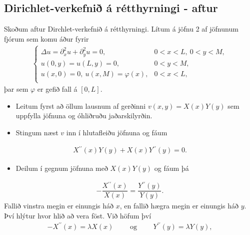 \documentclass[a4paper,10pt,icelandic]{sphinxmanual}
\begin{document}
\subsection{Dirichlet-verkefnið á rétthyrningi - aftur}
\label{\detokenize{Kafli03:dirichlet-verkefni-a-retthyrningi-aftur}}
Skoðum aftur Dirchlet-verkefnið á rétthyrningi. Lítum á jöfnu 2 af jöfnunum fjórum sem komu áður fyrir
\begin{equation*}
\begin{split}\begin{cases} \Delta u={\partial}_x^2u+{\partial}_y^2u=0, &0<x<L, \ 0<y<M,\\
 u(0,y)=u(L,y)=0, &0<y<M,\\
 u(x,0)=0, \ u(x,M)=\varphi(x), &0<x<L,\\
 \end{cases}\end{split}
\end{equation*}
þar sem \(\varphi\) er gefið fall á \([0,L]\).
\begin{itemize}
\item {} 
Leitum fyrst að öllum lausnum af gerðinni \(v(x,y)=X(x)Y(y)\) sem uppfylla jöfnuna og óhliðruðu jaðarskilyrðin.

\item {} 
Stingum næst \(v\) inn í hlutafleiðu jöfnuna og fáum

\end{itemize}
\begin{equation*}
\begin{split}X{{^{\prime\prime}}}(x)Y(y)+X(x)Y{{^{\prime\prime}}}(y)=0.\end{split}
\end{equation*}\begin{itemize}
\item {} 
Deilum í gegnum jöfnuna með \(X(x)Y(y)\) og fáum þá

\end{itemize}
\begin{equation*}
\begin{split}-\dfrac{X{{^{\prime\prime}}}(x)}{X(x)}=\dfrac{Y{{^{\prime\prime}}}(y)}{Y(y)}.\end{split}
\end{equation*}
Fallið vinstra megin er einungis háð \(x\), en fallið hægra megin er einungis háð \(y\). Því hlýtur hvor hlið að vera föst. Við
höfum því
\begin{equation*}
\begin{split}-X{{^{\prime\prime}}}(x)=\lambda X(x) \qquad \text{ og } \qquad Y{{^{\prime\prime}}}(y)=\lambda Y(y),\end{split}
\end{equation*}
\end{document}
